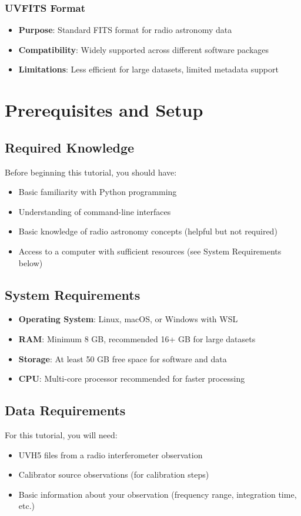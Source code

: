 \documentclass[11pt]{article}
\begin{document}
\subsubsection{UVFITS Format}
\begin{itemize}
    \item \textbf{Purpose}: Standard FITS format for radio astronomy data
    \item \textbf{Compatibility}: Widely supported across different software packages
    \item \textbf{Limitations}: Less efficient for large datasets, limited metadata support
\end{itemize}

\section{Prerequisites and Setup}

\subsection{Required Knowledge}
Before beginning this tutorial, you should have:
\begin{itemize}
    \item Basic familiarity with Python programming
    \item Understanding of command-line interfaces
    \item Basic knowledge of radio astronomy concepts (helpful but not required)
    \item Access to a computer with sufficient resources (see System Requirements below)
\end{itemize}

\subsection{System Requirements}
\begin{itemize}
    \item \textbf{Operating System}: Linux, macOS, or Windows with WSL
    \item \textbf{RAM}: Minimum 8 GB, recommended 16+ GB for large datasets
    \item \textbf{Storage}: At least 50 GB free space for software and data
    \item \textbf{CPU}: Multi-core processor recommended for faster processing
\end{itemize}

\subsection{Data Requirements}
For this tutorial, you will need:
\begin{itemize}
    \item UVH5 files from a radio interferometer observation
    \item Calibrator source observations (for calibration steps)
    \item Basic information about your observation (frequency range, integration time, etc.)
\end{itemize}
\end{document}
